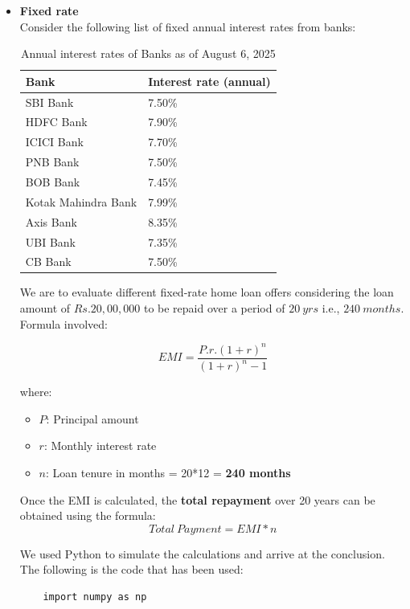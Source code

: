 \begin{itemize}


\item %
\textbf{Fixed rate}\\

Consider the following list of fixed annual interest rates from banks:

\begin{table}[h]
    \centering
    \begin{tabular}{l|l}
        \toprule
        \textbf{Bank} & \textbf{Interest rate (annual)} \\
        \midrule
        SBI Bank & 7.50\%\\
        HDFC Bank & 7.90\%\\
        ICICI Bank & 7.70\%\\
        PNB Bank & 7.50\%\\
        BOB Bank & 7.45\%\\
        Kotak Mahindra Bank & 7.99\%\\
        Axis Bank & 8.35\%\\
        UBI Bank & 7.35\%\\
        CB Bank & 7.50\%\\
        \bottomrule
    \end{tabular}
    \caption{Annual interest rates of Banks as of August 6, 2025}
    \label{tab:bank-interest-rates}
\end{table}

We are to evaluate different fixed-rate home loan offers considering the loan amount of $Rs.20,00,000$ to be repaid over a period of $20\ yrs$ i.e., $240\ months$.\\

\pagebreak
Formula involved:

\[
EMI = \frac{P.r.(1+r)^n}{(1+r)^n-1}
\]

where:
\begin{itemize}
    \item $P$: Principal amount
    \item $r$: Monthly interest rate
    \item $n$: Loan tenure in months = 20*12 = \textbf{240 months}
\end{itemize}

Once the EMI is calculated, the \textbf{total repayment} over 20 years can be obtained using the formula:
\[
Total\ Payment = EMI*n
\]

We used Python to simulate the calculations and arrive at the conclusion. The following is the code that has been used:
\begin{verbatim}
    import numpy as np
    

\end{verbatim}
\end{itemize}
